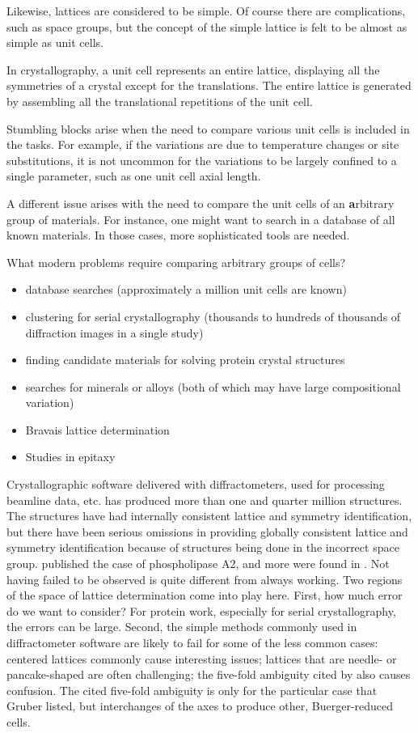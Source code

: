 \documentclass[preprint]{iucr}              %
\numberwithin{equation}{section}
\begin{document}
Likewise, lattices are considered to be simple. Of course
there are complications, such as space groups, but the concept
of the simple lattice is felt to be almost as simple as
unit cells.

In crystallography, a unit cell represents an entire lattice, displaying all the symmetries of a crystal except for the translations.  The entire lattice is generated by assembling all the translational repetitions of the unit cell.
	
Stumbling blocks arise when the need to compare various unit
cells is included in the tasks. For example, if the variations are due
to temperature changes or site substitutions, it is not
uncommon for the variations to be largely confined to a single
parameter, such as one unit cell axial length. 

A different issue arises with the need to compare the unit
cells of an \textbf{a}rbitrary group of materials. For instance, one
might want to search in a database of all known materials. In
those cases, more sophisticated tools are needed. 

What modern problems require comparing arbitrary groups of cells?
\begin{itemize}
	\item database searches (approximately a million unit cells are known)
	\item clustering for serial crystallography (thousands to hundreds of thousands of diffraction images in a single study)
	\item finding candidate materials for solving protein crystal structures 
	\cite{nanao2022id23}
	\item searches for minerals or alloys (both of which may have large compositional variation)
	\item Bravais lattice determination
	\item Studies in epitaxy \cite{yang2014unit}
\end{itemize}

Crystallographic software delivered with diffractometers, used for processing
beamline data, etc. has produced more than one and quarter million structures. The structures have had internally consistent lattice and
symmetry identification, but there have been serious omissions in 
providing globally consistent lattice and symmetry identification
because of structures being done in the incorrect space group.
 published the case of phospholipase
A2, and more were found in .
Not having failed to be observed is quite different from always working. Two regions of the space of lattice determination come into play here. 
First, how much error do we want to consider? For protein work, especially for serial crystallography, the errors can be large. Second, the simple methods commonly used in 
diffractometer software are likely to fail for 
some of the less common cases: centered lattices commonly cause interesting issues; lattices that are needle- or pancake-shaped are often challenging;
the five-fold ambiguity cited by  also causes confusion. The cited five-fold ambiguity is only for the particular
case that Gruber listed, but interchanges of the axes to produce
other, Buerger-reduced cells.
	
\end{document}
